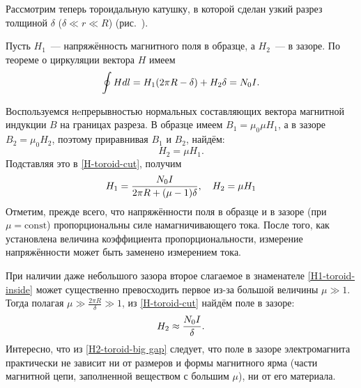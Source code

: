 Рассмотрим теперь тороидальную катушку, в которой сделан узкий разрез толщиной
$\delta$ ($\delta \ll r \ll R$) (рис.~).

Пусть $H_1$~--- напряжённость магнитного поля в
образце, а $H_2$~--- в зазоре. По теореме о циркуляции вектора $H$ имеем
\begin{equation}
	\eqmark{H-toroid-cut}
	\oint {Hdl} = H_1 (2\pi R - \delta) + H_2 \delta  = N_0 I.
\end{equation}

Воспользуемся нeпрерывностью нормальных составляющих вектора магнитной
индукции $B$ на границах разреза. В образце имеем $B_1 = \mu_0 \mu H_1$,
а в зазоре $B_2 = \mu_0 H_2$, поэтому приравнивая $B_1$ и $B_2$, найдём:
\begin{equation*}H_2 = \mu H_1.\end{equation*}
Подставляя это в \eqref{H-toroid-cut}, получим
\begin{equation}
	\eqmark{H1-toroid-inside}
	H_1 = \frac{N_0 I}{2\pi R + (\mu - 1)\delta},\quad H_2 = \mu H_1
\end{equation}
Отметим, прежде всего, что напряжённости поля в образце и в зазоре
(при $\mu = \mathrm{const}$) пропорциональны силе намагничивающего тока.
После того, как установлена величина коэффициента
пропорциональности, измерение напряжённости может быть заменено измерением тока.

При наличии даже небольшого зазора второе слагаемое в знаменателе
\eqref{H1-toroid-inside} может существенно превосходить первое из-за большой величины
$\mu\gg1$. Тогда полагая $\mu\gg \frac{2\pi R}{\delta}\gg 1$, из
\eqref{H-toroid-cut} найдём поле в зазоре:
\begin{equation}
	\eqmark{H2-toroid-big gap}
	H_2 \approx \frac{N_0 I}{\delta}.
\end{equation}
Интересно, что из \eqref{H2-toroid-big gap} следует, что поле в зазоре
электромагнита практически не зависит ни от размеров и формы магнитного ярма (части
магнитной цепи, заполненной веществом с большим $\mu$), ни от его материала.




